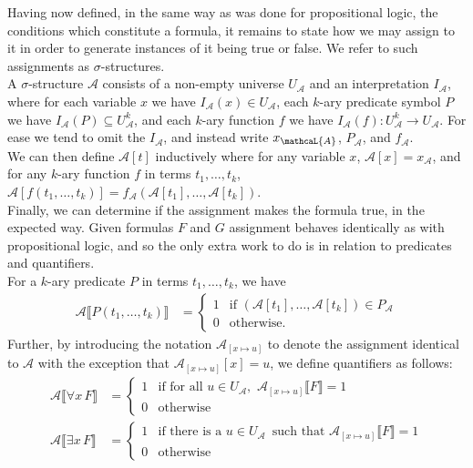 \documentclass{tikzposter} %
\begin{document}
\begin{columns}
{    Having now defined, in the same way as was done for propositional logic, the conditions which constitute a formula, it remains to state how we may assign to it in order to generate instances of it being true or false. We refer to such assignments as $\sigma$-structures.\\

    A $\sigma$-structure $\mathcal{A}$ consists of a non-empty universe $U_{\mathcal{A}}$ and an interpretation $I_{\mathcal{A}}$, where for each variable $x$ we have $I_{\mathcal{A}}(x) \in U_{\mathcal{A}}$, each $k$-ary predicate symbol $P$ we have $I_{\mathcal{A}}(P) \subseteq U_{\mathcal{A}}^{k}$, and each $k$-ary function $f$ we have $I_{\mathcal{A}}(f) : U_{\mathcal{A}}^{k} \to U_{\mathcal{A}}$. For ease we tend to omit the $I_{\mathcal{A}}$, and instead write $x_{\mathcaL{A}}$, $P_{\mathcal{A}}$, and $f_{\mathcal{A}}$. \\

    We can then define $\mathcal{A}[t]$ inductively where for any variable $x$, $\mathcal{A}[x] = x_{\mathcal{A}}$, and for any $k$-ary function $f$ in terms $t_{1},\dots,t_{k}$, $\mathcal{A}[f(t_{1}, \dots, t_{k})] = f_{\mathcal{A}}(\mathcal{A}[t_{1}], \dots, \mathcal{A}[t_{k}])$. \\

    Finally, we can determine if the assignment makes the formula true, in the expected way. Given formulas $F$ and $G$ assignment behaves identically as with propositional logic, and so the only extra work to do is in relation to predicates and quantifiers. \\

    For a $k$-ary predicate $P$ in terms $t_{1},\dots,t_{k}$, we have
    \begin{align*}
      \mathcal{A} \llbracket P(t_{1},\dots,t_{k}) \rrbracket &= \begin{cases}
        1 & \text{if } (\mathcal{A}[t_{1}],\dots,\mathcal{A}[t_{k}]) \in P_{\mathcal{A}} \\
        0 & \text{otherwise.}
      \end{cases}
    \end{align*}
    Further, by introducing the notation $\mathcal{A}_{[x \mapsto u]}$ to denote the assignment identical to $\mathcal{A}$ with the exception that $\mathcal{A}_{[x \mapsto u]}[x] = u$, we define quantifiers as follows:
    \begin{align*}
      \mathcal{A} \llbracket \forall x \, F \rrbracket &= \begin{cases}
        1 & \text{if for all } u \in U_{\mathcal{A}},\,\, \mathcal{A}_{[x \mapsto u]}\llbracket F \rrbracket = 1 \\
        0 & \text{otherwise}
      \end{cases} \\
       \mathcal{A} \llbracket \exists x \, F \rrbracket &= \begin{cases}
        1 & \text{if there is a } u \in U_{\mathcal{A}} \,\text{ such that } \mathcal{A}_{[x \mapsto u]}\llbracket F \rrbracket = 1 \\
        0 & \text{otherwise}
      \end{cases}
    \end{align*}

}
\end{columns}
\end{document}
